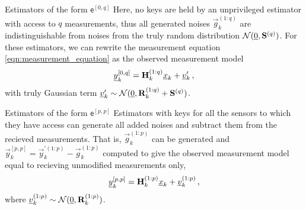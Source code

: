 \documentclass[letterpaper, 10 pt, conference]{ieeeconf}
\begin{document}
\begin{LaTeXdescription}
  \item[Estimators of the form $\mathsf{e}^{[0,q]}$] Here, no keys are held by an unprivileged estimator with access to $q$ measurements, thus all generated noises $\vec{g}_k^{(1:q)}$ are indistinguishable from noises from the truly random distribution $\mathcal{N}({\underline{0}}, {{\mathbf{S}}}^{(q)})$. For these estimators, we can rewrite the measurement equation \eqref{eqn:measurement_equation} as the observed measurement model
  \begin{equation}\label{eqn:0q_obs_measurement_model}
    {\underline{y}}_k^{[0,q]} = {{\mathbf{H}}}_k^{(1:q)}{\underline{x}}_k + {\underline{v}}_k^{\prime}\,,
  \end{equation}
  with truly Gaussian term ${\underline{v}}_k^{\prime} \sim \mathcal{N}({\underline{0}}, {{\mathbf{R}}}_k^{(1:q)}+{{\mathbf{S}}}^{(q)})$.
  
  \item[Estimators of the form $\mathsf{e}^{[p,p]}$] Estimators with keys for all the sensors to which they have access can generate all added noises and subtract them from the recieved measurements. That is, $\vec{g}_k^{(1:p)}$ can be generated and $\vec{y}_k^{[p,p]}=\vec{y}_k^{\prime(1:p)}-\vec{g}_k^{(1:p)}$ computed to give the observed measurement model equal to recieving unmodified measurements only,
  \begin{equation}\label{eqn:pp_obs_measurement_model}
    {\underline{y}}_k^{[p,p]} = {{\mathbf{H}}}_k^{(1:p)}{\underline{x}}_k + {\underline{v}}_k^{(1:p)}\,,
  \end{equation}
  where ${\underline{v}}_k^{(1:p)} \sim \mathcal{N}({\underline{0}}, {{\mathbf{R}}}_k^{(1:p)})$.


\end{LaTeXdescription}
\end{document}
